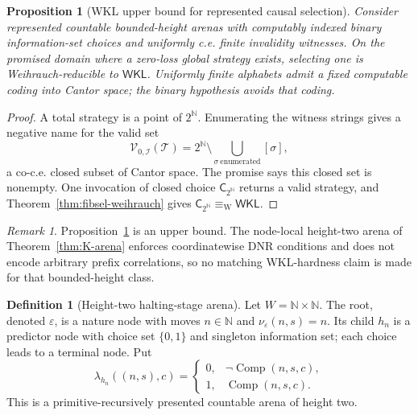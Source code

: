 \documentclass[11pt]{article}
\theoremstyle{plain}
\newtheorem{proposition}[theorem]{Proposition}
\theoremstyle{definition}
\newtheorem{definition}[theorem]{Definition}
\theoremstyle{remark}
\newtheorem{remark}[theorem]{Remark}
\newcommand{\N}{\mathbb{N}}
\begin{document}
\begin{proposition}[WKL upper bound for represented causal selection]
\label{prop:causal-WKL-upper}
Consider represented countable bounded-height arenas with computably indexed
binary information-set choices and uniformly c.e. finite invalidity witnesses.
On the promised domain where a zero-loss global strategy exists, selecting one
is Weihrauch-reducible to $\mathsf{WKL}$. Uniformly finite alphabets admit a
fixed computable coding into Cantor space; the binary hypothesis avoids that
coding.
\end{proposition}

\begin{proof}
A total strategy is a point of $2^\N$. Enumerating the witness strings gives a
negative name for the valid set
\[
\mathscr V_{0,\mathcal I}(\mathcal T)
=2^\N\setminus\bigcup_{\sigma\ \mathrm{enumerated}}[\sigma],
\]
a co-c.e. closed subset of Cantor space. The promise says this closed set is
nonempty. One invocation of closed choice $\mathsf C_{2^\N}$ returns a valid
strategy, and Theorem~\ref{thm:fibsel-weihrauch} gives
$\mathsf C_{2^\N}\equiv_{\mathrm W}\mathsf{WKL}$.
\end{proof}

\begin{remark}
Proposition~\ref{prop:causal-WKL-upper} is an upper bound. The node-local
height-two arena of Theorem~\ref{thm:K-arena} enforces coordinatewise DNR
conditions and does not encode arbitrary prefix correlations, so no matching
WKL-hardness claim is made for that bounded-height class.
\end{remark}

\begin{definition}[Height-two halting-stage arena]
\label{def:K-arena}
Let $W=\N\times\N$. The root, denoted $\varepsilon$, is a nature node with moves
$n\in\N$ and $\nu_\varepsilon(n,s)=n$. Its child $h_n$ is a predictor node with choice set
$\{0,1\}$ and singleton information set; each choice leads to a terminal node.
Put
\[
\lambda_{h_n}((n,s),c)=
\begin{cases}
0,&\neg\operatorname{Comp}(n,s,c),\\
1,&\operatorname{Comp}(n,s,c).
\end{cases}
\]
This is a primitive-recursively presented countable arena of height two.
\end{definition}
\end{document}
